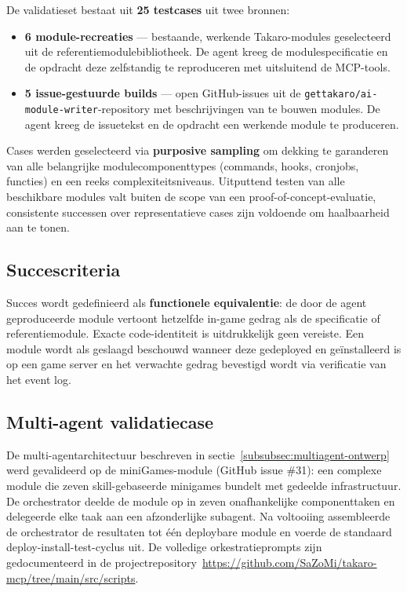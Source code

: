 De validatieset bestaat uit \textbf{25 testcases} uit twee bronnen:

\begin{itemize}
    \item \textbf{6 module-recreaties} — bestaande, werkende Takaro-modules geselecteerd uit de referentiemodulebibliotheek. De agent kreeg de modulespecificatie en de opdracht deze zelfstandig te reproduceren met uitsluitend de MCP-tools.
    \item \textbf{5 issue-gestuurde builds} — open GitHub-issues uit de \texttt{gettakaro/ai-module-writer}-repository met beschrijvingen van te bouwen modules. De agent kreeg de issuetekst en de opdracht een werkende module te produceren.
\end{itemize}

Cases werden geselecteerd via \textbf{purposive sampling} om dekking te garanderen van alle belangrijke modulecomponenttypes (commands, hooks, cronjobs, functies) en een reeks complexiteitsniveaus. Uitputtend testen van alle beschikbare modules valt buiten de scope van een proof-of-concept-evaluatie, consistente successen over representatieve cases zijn voldoende om haalbaarheid aan te tonen.

\subsection{Succescriteria}\label{subsec:succescriteria}

Succes wordt gedefinieerd als \textbf{functionele equivalentie}: de door de agent geproduceerde module vertoont hetzelfde in-game gedrag als de specificatie of referentiemodule. Exacte code-identiteit is uitdrukkelijk geen vereiste. Een module wordt als geslaagd beschouwd wanneer deze gedeployed en geïnstalleerd is op een game server en het verwachte gedrag bevestigd wordt via verificatie van het event log.

\subsection{Multi-agent validatiecase}\label{subsec:multiagent}

De multi-agentarchitectuur beschreven in sectie~\ref{subsubsec:multiagent-ontwerp} werd gevalideerd op de miniGames-module (GitHub issue \#31): een complexe module die zeven skill-gebaseerde minigames bundelt met gedeelde infrastructuur. De orchestrator deelde de module op in zeven onafhankelijke componenttaken en delegeerde elke taak aan een afzonderlijke subagent. Na voltooiing assembleerde de orchestrator de resultaten tot één deploybare module en voerde de standaard deploy-install-test-cyclus uit. De volledige orkestratieprompts zijn gedocumenteerd in de projectrepository~\url{https://github.com/SaZoMi/takaro-mcp/tree/main/src/scripts}.

